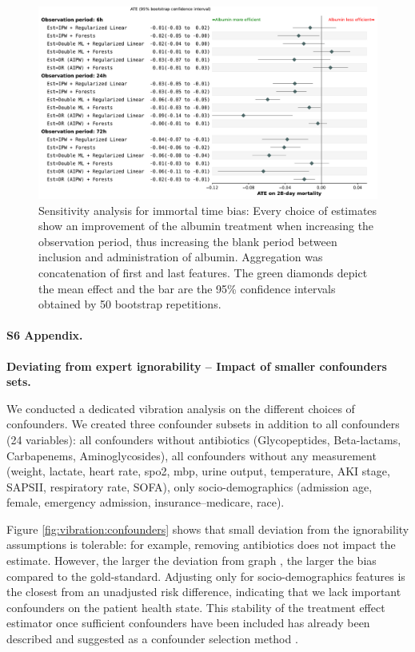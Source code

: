 \documentclass[10pt,letterpaper]{article}
\begin{document}
\begin{figure}[h!]
  \centering
  \includegraphics[width=\linewidth]{img_supp/itb__dr_forest_agg_first_last__bs_30_supp.pdf}
  \caption{Sensitivity analysis for immortal time bias: Every choice of
    estimates show an improvement of the albumin treatment when increasing the
    observation period, thus increasing the blank period between inclusion and
    administration of albumin. Aggregation was concatenation of first and last
    features. The green diamonds depict the mean effect and the bar are the
    95\% confidence intervals obtained by 50 bootstrap
    repetitions.}\label{apd:fig:detailed_results_itb}
\end{figure}
\clearpage

\paragraph*{S6 Appendix.}
\label{apd:vibration_analysis_for_confounders}
{\bf Deviating from expert ignorability -- Impact of smaller confounders sets.}


We conducted a dedicated vibration analysis on the different choices of
confounders. We created three confounder subsets in addition to all
confounders (24 variables): all confounders without antibiotics
(Glycopeptides, Beta-lactams, Carbapenems, Aminoglycosides), all confounders
without any measurement (weight, lactate, heart rate,
spo2, mbp, urine output, temperature, AKI stage, SAPSII, respiratory rate, SOFA), only
socio-demographics (admission age, female, emergency admission,
insurance--medicare, race).

Figure \ref{fig:vibration:confounders} shows that small
deviation from the ignorability assumptions is tolerable: for example, removing
antibiotics does not impact the estimate. However, the larger the
deviation from graph , the larger the bias
compared to the gold-standard. Adjusting only for socio-demographics features
is the closest from an unadjusted risk difference, indicating that we lack
important confounders on the patient health state. This stability of the
treatment effect estimator once sufficient confounders have been included has
already been described and suggested as a confounder selection method
\cite{loh2021confounder}.
\clearpage
\end{document}
